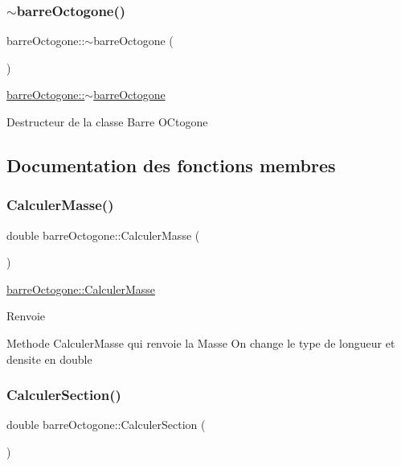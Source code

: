 \subsubsection{\texorpdfstring{$\sim$barre\+Octogone()}{~barreOctogone()}}
{\footnotesize\ttfamily barre\+Octogone\+::$\sim$barre\+Octogone (\begin{DoxyParamCaption}{ }\end{DoxyParamCaption})}



\hyperlink{classbarre_octogone_ace0c5f7ff3f012b530679e0784a5a577}{barre\+Octogone\+::$\sim$barre\+Octogone} 

Destructeur de la classe Barre O\+Ctogone 

\subsection{Documentation des fonctions membres}
\mbox{\label{classbarre_octogone_a1c634ed8124610f7771bd3d4b55d9893}} 
\subsubsection{\texorpdfstring{Calculer\+Masse()}{CalculerMasse()}}
{\footnotesize\ttfamily double barre\+Octogone\+::\+Calculer\+Masse (\begin{DoxyParamCaption}{ }\end{DoxyParamCaption})}



\hyperlink{classbarre_octogone_a1c634ed8124610f7771bd3d4b55d9893}{barre\+Octogone\+::\+Calculer\+Masse} 

\begin{DoxyReturn}{Renvoie}

\end{DoxyReturn}
Methode Calculer\+Masse qui renvoie la Masse On change le type de longueur et densite en double \mbox{\label{classbarre_octogone_a11253e9fe3c969943a950d97ddd36f66}} 
\subsubsection{\texorpdfstring{Calculer\+Section()}{CalculerSection()}}
{\footnotesize\ttfamily double barre\+Octogone\+::\+Calculer\+Section (\begin{DoxyParamCaption}{ }\end{DoxyParamCaption})}



